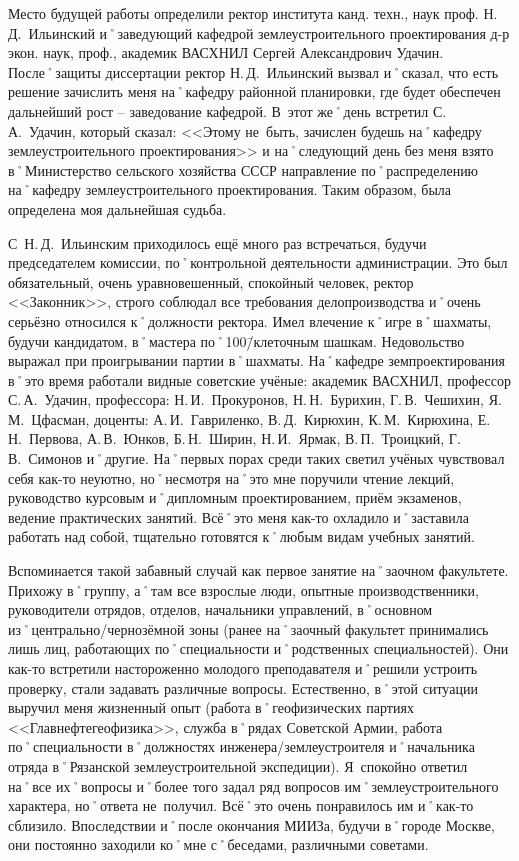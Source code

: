 Место будущей работы определили ректор института канд. техн., наук проф. Н.\,Д.~Ильинский и˚заведующий кафедрой землеустроительного проектирования д-р экон. наук, проф., академик ВАСХНИЛ Сергей Александрович Удачин. После˚защиты диссертации ректор Н.\,Д.~Ильинский вызвал и˚сказал, что есть решение зачислить меня на˚кафедру районной планировки, где будет обеспечен дальнейший рост \--- заведование кафедрой. В~этот же˚день встретил С.\,А.~Удачин, который сказал: <<Этому не~быть, зачислен будешь на˚кафедру землеустроительного проектирования>> и на˚следующий день без меня взято в˚Министерство сельского хозяйства СССР направление по˚распределению на˚кафедру землеустроительного проектирования. Таким образом, была определена моя дальнейшая судьба. 

С~Н.\,Д.~Ильинским приходилось ещё много раз встречаться, будучи председателем комиссии, по˚контрольной деятельности администрации. Это был обязательный, очень уравновешенный, спокойный человек, ректор <<Законник>>, строго соблюдал все требования делопроизводства и˚очень серьёзно относился к˚должности ректора. Имел влечение к˚игре в˚шахматы, будучи кандидатом, в˚мастера по˚100\=/клеточным шашкам. Недовольство выражал при проигрывании партии в˚шахматы. На˚кафедре земпроектирования в˚это время работали видные советские учёные: академик ВАСХНИЛ, профессор С.\,А.~Удачин, профессора: Н.\,И.~Прокуронов, Н.\,Н.~Бурихин, Г.\,В.~Чешихин, Я.\,М.~Цфасман, доценты: А.\,И.~Гавриленко, В.\,Д.~Кирюхин, К.\,М.~Кирюхина, Е.\,Н.~Первова, А.\,В.~Юнков, Б.\,Н.~Ширин, Н.\,И.~Ярмак, В.\,П.~Троицкий, Г.\,В.~Симонов и˚другие. На˚первых порах среди таких светил учёных чувствовал себя как-то неуютно, но˚несмотря на˚это мне поручили чтение лекций, руководство курсовым и˚дипломным проектированием, приём экзаменов, ведение практических занятий. Всё˚это меня как-то охладило и˚заставила работать над собой, тщательно готовятся к˚любым видам учебных занятий.

Вспоминается такой забавный случай как первое занятие на˚заочном факультете. Прихожу в˚группу, а˚там все взрослые люди, опытные производственники, руководители отрядов, отделов, начальники управлений, в˚основном из˚центрально\-/чернозёмной зоны (ранее на˚заочный факультет принимались лишь лиц, работающих по˚специальности и˚родственных специальностей). Они как-то встретили настороженно молодого преподавателя и˚решили устроить проверку, стали задавать различные вопросы. Естественно, в˚этой ситуации выручил меня жизненный опыт (работа в˚геофизических партиях <<Главнефтегеофизика>>, служба в˚рядах Советской Армии, работа по˚специальности в˚должностях инженера\-/землеустроителя и˚начальника отряда в˚Рязанской землеустроительной экспедиции). Я~спокойно ответил на˚все их˚вопросы и˚более того задал ряд вопросов им˚землеустроительного характера, но˚ответа не~получил. Всё˚это очень понравилось им и˚как-то сблизило. Впоследствии и˚после окончания МИИЗа, будучи в˚городе Москве, они постоянно заходили ко˚мне с˚беседами, различными советами. 

